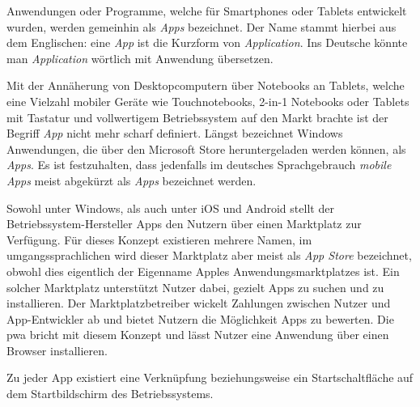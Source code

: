 Anwendungen oder Programme, welche für Smartphones oder Tablets entwickelt wurden, werden gemeinhin als \textit{Apps} bezeichnet. Der Name stammt hierbei aus dem Englischen: eine \textit{App} ist die Kurzform von \textit{Application}. Ins Deutsche könnte man \textit{Application} wörtlich mit Anwendung übersetzen. \cite{BegriffApp}

Mit der Annäherung von Desktopcomputern über Notebooks an Tablets, welche eine Vielzahl mobiler Geräte wie Touchnotebooks, 2-in-1 Notebooks oder Tablets mit Tastatur und vollwertigem Betriebssystem auf den Markt brachte ist der Begriff \textit{App} nicht mehr scharf definiert.
Längst bezeichnet Windows Anwendungen, die über den Microsoft Store heruntergeladen werden können, als \textit{Apps}. Es ist festzuhalten, dass jedenfalls im deutsches Sprachgebrauch \textit{mobile Apps} meist abgekürzt als \textit{Apps} bezeichnet werden.

Sowohl unter Windows, als auch unter iOS und Android stellt der Betriebssystem-Hersteller Apps den Nutzern über einen Marktplatz zur Verfügung. Für dieses Konzept existieren mehrere Namen, im umgangssprachlichen wird dieser Marktplatz aber meist als \textit{App Store} bezeichnet, obwohl dies eigentlich der Eigenname Apples Anwendungsmarktplatzes ist. 
Ein solcher Marktplatz unterstützt Nutzer dabei, gezielt Apps zu suchen und zu installieren. Der Marktplatzbetreiber wickelt Zahlungen zwischen Nutzer und App-Entwickler ab und bietet Nutzern die Möglichkeit Apps zu bewerten. 
Die \acf{pwa} bricht mit diesem Konzept und lässt Nutzer eine Anwendung über einen Browser installieren. 

Zu jeder App existiert eine Verknüpfung beziehungsweise ein Startschaltfläche auf dem Startbildschirm des Betriebssystems.